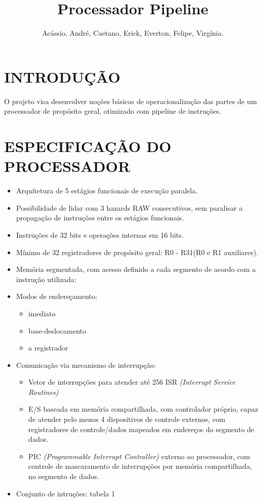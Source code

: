 \documentclass[letterpaper, 10 pt, conference]{ieeeconf}  %
\title{\LARGE \bf Processador Pipeline}
\author{Acássio, André, Caetano, Erick, Everton, Felipe, Virgínia.}
\begin{document}
\maketitle 
\thispagestyle{empty}
\pagestyle{empty}

\begin{abstract}

\end{abstract}

\section{INTRODUÇÃO}

O projeto visa desenvolver noções básicas de operacionalização das partes de um processador de propósito geral, otimizado com pipeline de instruções.

\section{ESPECIFICAÇÃO DO PROCESSADOR}

\begin{itemize}
\item Arquitetura de 5 estágios funcionais de execução paralela.
\item Possibilidade de lidar com 3 hazards RAW consecutivos, sem paralisar a propagação de instruções entre os estágios funcionais.
\item Instruções de 32 bits e operações internas em 16 bits.
\item Mínimo de 32 registradores de propósito geral: R0 - R31(R0 e R1 auxiliares).
\item Memória segmentada, com acesso definido a cada segmento de acordo com a instrução utilizada:
\item Modos de endereçamento: 
\begin{itemize}
\item imediato
\item base-deslocamento
\item a registrador
\end{itemize}

\item Comunicação via mecanismo de interrupção:
\begin{itemize}
\item Vetor de interrupções para atender até 256 ISR \textit{(Interrupt Service Routines)}
\item E/S baseada em memória compartilhada, com controlador próprio, capaz de atender pelo menos 4 dispositivos de controle externos, com registradores de controle/dados mapeados em endereços do segmento de dados.
\item PIC \textit{(Programmable Interrupt Controller)} externo ao processador, com controle de mascaramento de interrupções por memória compartilhada, no segmento de dados.
\end{itemize}
\item Conjunto de intruções: tabela 1
\end{itemize}
\end{document}
